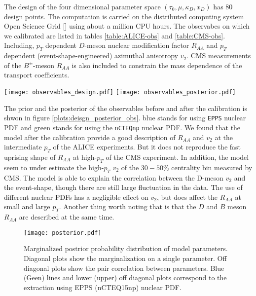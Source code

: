The design of the four dimensional parameter space  $(\tau_0, \mu, \kappa_D, x_D)$ has 80 design points.
The computation is carried on the distributed computing system Open Science Grid [] using about a million CPU hours.
The observabes on which we calibrated are listed in tables \ref{table:ALICE-obs} and \ref{table:CMS-obs}. 
Including, $p_T$ dependent $D$-meson nuclear modification factor $R_{AA}$ and $p_T$ dependent (event-shape-engineered) azimuthal anisotropy $v_2$.
CMS measurements of the $B^{\pm}$-meson $R_{AA}$ is also included to constrain the mass dependence of the transport coefficients.

\begin{figure*}
\texttt{[image: observables\_design.pdf]}
\texttt{[image: observables\_posterior.pdf]}
\caption{Left: the prior, i.e. the full range of calculations in parameter space. Right: the posterior, i.e. observables sampled from model emulators after calibration. In both figures, blue (green) lines are calculations with {\tt EPPS} ({\tt nCTEQ15np}) nuclear PDF.}\label{plots:deisgn_posterior_obs}
\end{figure*}

The prior and the posterior of the observables before and after the calibration is shwon in figure \ref{plots:deisgn_posterior_obs}.
blue stands for using {\tt EPPS} nuclear PDF and green stands for using the {\tt nCTEQnp}  nuclear PDF.
We found that the model after the calibration provide a good description of $R_{AA}$ and $v_2$ at the intermediate $p_T$ of the ALICE experiments.
But it does not reproduce the fast uprising shape of $R_{AA}$ at high-$p_T$ of the CMS experiment.
In addition, the model seem to under estimate the high-$p_T$ $v_2$ of the $30-50\%$ centrality bin measured by CMS.
The model is able to explain the correlation between the D-meson $v_2$ and the event-shape, though there are still large fluctuation in the data.
The use of different nuclear PDFs has a negligible effect on $v_2$, but does affect the $R_{AA}$ at small and large $p_T$.
Another thing worth noting that is that the $D$ and $B$ meson $R_{AA}$ are described at the same time.

\begin{figure}
\centering
\texttt{[image: posterior.pdf]}
\caption{Marginalized postrior probability distribution of model parameters. Diagonal plots show the marginalization on a single parameter. Off diagonal plots show the pair correlation between parameters. Blue (Geen) lines and lower (upper) off diagonal plots correspond to the extraction using EPPS (nCTEQ15np) nuclear PDF.}\label{plots:posterior}
\end{figure}

